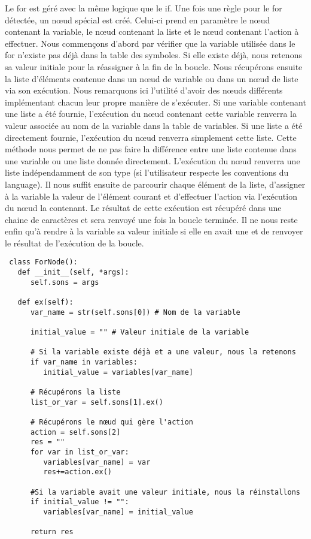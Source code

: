 \documentclass[a4paper,10pt]{article}
\begin{document}
Le \textrm{for} est géré avec la même logique que le \textrm{if}. Une fois une règle pour le \textrm{for} détectée, un nœud spécial est créé. Celui-ci prend en paramètre le nœud contenant
la variable, le nœud contenant la liste et le nœud contenant l'action à effectuer. \newline \newline Nous commençons d'abord par vérifier que la variable utilisée dans le for n'existe pas déjà dans la 
table des symboles. Si elle existe déjà, nous retenons sa valeur initiale pour la réassigner à la fin de la boucle. Nous récupérons ensuite la liste d'éléments contenue dans un nœud de variable
ou dans un nœud de liste via son exécution. Nous remarquons ici l'utilité d'avoir des nœuds différents implémentant chacun leur propre manière de s'exécuter. Si une variable contenant
une liste a été fournie, l'exécution du nœud contenant cette variable renverra la valeur associée au nom de la variable dans la table de variables. Si une liste a été directement fournie,
l'exécution du nœud renverra simplement cette liste. Cette méthode nous permet de ne pas faire la différence entre une liste contenue dans une variable ou une liste donnée directement. L'exécution
du nœud renverra une liste indépendamment de son type (si l'utilisateur respecte les conventions du language). Il nous suffit ensuite de parcourir chaque élément de la liste, d'assigner à la variable
la valeur de l'élément courant et d'effectuer l'action via l'exécution du nœud la contenant. Le résultat de cette exécution est récupéré dans une chaine de caractères et sera renvoyé une fois la boucle 
terminée. Il ne nous reste enfin qu'à rendre à la variable sa valeur initiale si elle en avait une et de renvoyer le résultat de l'exécution de la boucle.
\begin{verbatim}
 class ForNode():
   def __init__(self, *args):
      self.sons = args
         
   def ex(self):
      var_name = str(self.sons[0]) # Nom de la variable

      initial_value = "" # Valeur initiale de la variable

      # Si la variable existe déjà et a une valeur, nous la retenons
      if var_name in variables:
         initial_value = variables[var_name]

      # Récupérons la liste
      list_or_var = self.sons[1].ex()
      
      # Récupérons le nœud qui gère l'action
      action = self.sons[2]
      res = ""
      for var in list_or_var:
         variables[var_name] = var
         res+=action.ex()

      #Si la variable avait une valeur initiale, nous la réinstallons
      if initial_value != "":
         variables[var_name] = initial_value

      return res
\end{verbatim}
\end{document}
